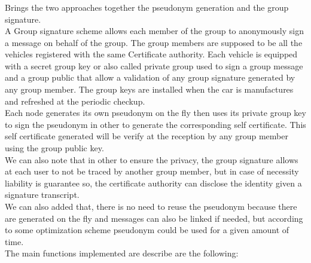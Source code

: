 \subsubsection{\hybrid}
Brings the two approaches together the pseudonym generation and the group signature.\\
A Group signature scheme allows each member of the group to anonymously sign a message on behalf of the group. The group members are supposed to be all the vehicles registered with the same Certificate authority. Each vehicle is equipped with a secret group key or also called private group used to sign a group message and a group public that allow a validation of any group signature generated by any group member.  The group keys are installed when the car is manufactures and refreshed at the periodic checkup.\\
 Each node generates its own pseudonym on the fly then uses its private group key to sign the pseudonym in other to generate the corresponding self certificate. This self certificate generated will be verify at the reception by any group member using the group public key.\\ We can also note that in other to ensure the privacy, the group signature allows at each user to not be traced by another group member, but in case of necessity liability is guarantee so, the certificate authority can disclose the identity given a signature transcript.\\
We can also added that, there is no need to reuse the pseudonym because there are generated on the fly and messages can also be linked if needed, but according to some optimization scheme pseudonym could be used for a given amount of time.\\   
The main functions implemented are describe are the following:

